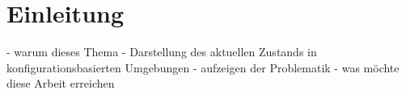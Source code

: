 \chapter{Einleitung}

- warum dieses Thema
- Darstellung des aktuellen Zustands in konfigurationsbasierten Umgebungen 
- aufzeigen der Problematik 
- was möchte diese Arbeit erreichen 